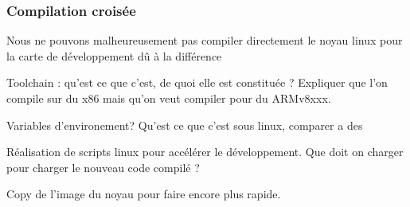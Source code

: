 \subsubsection{Compilation croisée}

Nous ne pouvons malheureusement pas compiler directement le noyau linux pour la carte de développement dû à la différence 


\vspace{10pt}


Toolchain : qu'est ce que c'est, de quoi elle est constituée ? Expliquer que l'on compile sur du x86 mais qu'on veut compiler pour du ARMv8xxx.

Variables d'environement? Qu'est ce que c'est sous linux, comparer a des 

Réalisation de scripts linux pour accélérer le développement. Que doit on charger pour charger le nouveau code compilé ?

Copy de l'image du noyau pour faire encore plus rapide.

